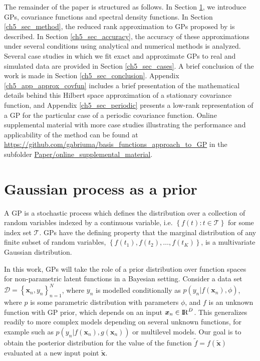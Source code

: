 \documentclass[onecolumn,a4paper,11pt]{article}
\begin{document}
The remainder of the paper is structured as follows. In Section \ref{ch4_gp}, we introduce GPs, covariance functions and spectral density functions. In Section \ref{ch5_sec_method}, the reduced rank approximation to GPs proposed by \cite{solin2018hilbert} is described. In Section \ref{ch5_sec_accuracy}, the accuracy of these approximations under several conditions using analytical and numerical methods is analyzed. Several case studies in which we fit
exact and approximate GPs to real and simulated data are provided in Section \ref{ch5_sec_cases}. A brief conclusion of the work is made in Section \ref{ch5_sec_conclusion}. Appendix \ref{ch5_app_approx_covfun} includes a brief presentation of the mathematical details behind this Hilbert space approximation of a stationary covariance function, and Appendix \ref{ch5_sec_periodic} presents a low-rank representation of a GP for the particular case of a periodic covariance function. 
Online supplemental material with more case studies illustrating the performance and applicability of the method can be found at \url{https://github.com/gabriuma/basis_functions_approach_to_GP} in the subfolder \url{Paper/online_supplemental_material}.


\section{Gaussian process as a prior}\label{ch4_gp}

A GP is a stochastic process which defines the distribution over a collection of random variables indexed by a continuous variable, i.e. $\left\lbrace f(t): t \in \mathcal{T}\right\rbrace$ for some index set $\mathcal{T}$. GPs have the defining property that the marginal distribution of any finite subset of random variables, $\left\lbrace f(t_1), f(t_2), \hdots, f(t_K) \right\rbrace$, is a multivariate Gaussian distribution.

In this work, GPs will take the role of a prior distribution over function spaces for non-parametric latent functions in a Bayesian setting. 
Consider a data set $\mathcal{D} = \left\lbrace \bm{x}_n, y_n \right\rbrace_{n=1}^N$, where $y_n$ is modelled conditionally as $p(y_n|f(\bm{x}_n),\phi)$, where $p$ is some parametric distribution with parameters  $\phi$, and $f$ is an unknown function with GP prior, which depends on an input $\bm{x}_n\in {\rm I\!R}^D$. This generalizes readily to more complex models depending on several unknown functions, for example such as $p(y_n|f(\bm{x}_n),g(\bm{x}_n))$ or multilevel models. Our goal is to obtain the posterior distribution for the value of the function $\tilde{f}=f(\tilde{\bm{x}})$  evaluated at a new input point $\tilde{\bm{x}}$.
\end{document}
